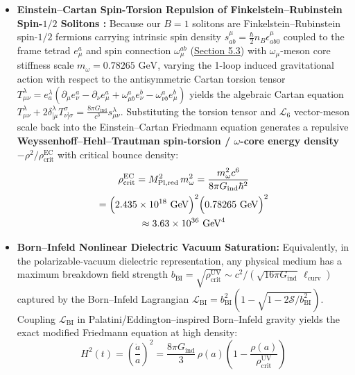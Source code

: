 \documentclass[10pt,aps,prd,twocolumn,superscriptaddress,nofootinbib,floatfix,longbibliography,showkeys]{revtex4-2}
\begin{document}
\begin{enumerate}
\begin{itemize}
    \item \textbf{Einstein--Cartan Spin-Torsion Repulsion of Finkelstein--Rubinstein Spin-$1/2$ Solitons \cite{ref22,ref23,ref24,ref25,ref26}:} Because our $B=1$ solitons are Finkelstein--Rubinstein spin-$1/2$ fermions carrying intrinsic spin density $s^\mu_{ab} = \frac{\hbar}{2} n_B \epsilon_{ab0}^\mu$ coupled to the frame tetrad $e^a_\mu$ and spin connection $\omega_\mu^{ab}$ (\hyperref[sec:5.3]{Section 5.3}) with $\omega_\mu$-meson core stiffness scale $m_\omega = 0.78265\text{ GeV}$, varying the 1-loop induced gravitational action with respect to the antisymmetric Cartan torsion tensor $T^\lambda_{\mu\nu} = e^\lambda_a(\partial_\mu e^a_\nu - \partial_\nu e^a_\mu + \omega_{\mu b}^a e^b_\nu - \omega_{\nu b}^a e^b_\mu)$ yields the algebraic Cartan equation $T^\lambda_{\mu\nu} + 2\delta^\lambda_{[\mu}T^\sigma_{\nu]\sigma} = \frac{8\pi G_{\text{ind}}}{c^3} s^\lambda_{\mu\nu}$. Substituting the torsion tensor and $\mathcal{L}_6$ vector-meson scale back into the Einstein--Cartan Friedmann equation generates a repulsive \textbf{Weyssenhoff--Hehl--Trautman spin-torsion / $\omega$-core energy density} $-\rho^2 / \rho_{\text{crit}}^{\text{EC}}$ \cite{ref22,ref23,ref24,ref25,ref26} with critical bounce density:
\begin{multline}
\rho_{\text{crit}}^{\text{EC}} = M_{\text{Pl,red}}^2\,m_\omega^2 = \frac{m_\omega^2 c^6}{8\pi G_{\text{ind}} \hbar^2} \\
= \Bigl(2.435 \times 10^{18}\text{ GeV}\Bigr)^2\Bigl(0.78265\text{ GeV}\Bigr)^2 \\
\approx 3.63 \times 10^{36}\text{ GeV}^4
\end{multline}
    \item \textbf{Born--Infeld Nonlinear Dielectric Vacuum Saturation:} Equivalently, in the polarizable-vacuum dielectric representation, any physical medium has a maximum breakdown field strength $b_{\text{BI}} = \sqrt{\rho_{\text{crit}}^{\text{UV}}} \sim c^2 / (\sqrt{16\pi G_{\text{ind}}}\,\ell_{\text{curv}})$ captured by the Born--Infeld Lagrangian $\mathcal{L}_{\text{BI}} = b_{\text{BI}}^2 (1 - \sqrt{1 - 2\mathcal{S}/b_{\text{BI}}^2})$. Coupling $\mathcal{L}_{\text{BI}}$ in Palatini/Eddington--inspired Born--Infeld gravity \cite{ref22,ref23,ref24} yields the exact modified Friedmann equation at high density:
\begin{equation}
H^2(t) = \left(\frac{\dot{a}}{a}\right)^2 = \frac{8\pi G_{\text{ind}}}{3}\,\rho(a)\left(1 - \frac{\rho(a)}{\rho_{\text{crit}}^{\text{UV}}}\right)
\end{equation}

\end{itemize}
\end{enumerate}
\end{document}
